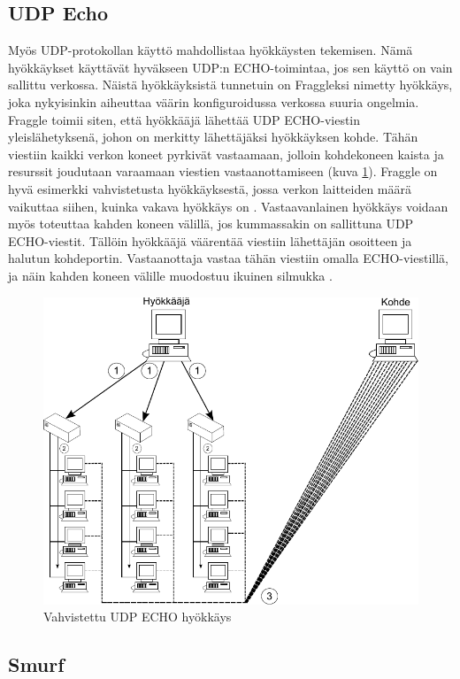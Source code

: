 \subsection{UDP Echo}

Myös UDP-protokollan käyttö mahdollistaa hyökkäysten tekemisen. Nämä
hyökkäykset käyt\-tä\-vät hyväkseen UDP:n ECHO-toimintaa, jos sen käyttö
on vain sallittu verkossa. Näistä hyökkäyksistä tunnetuin on Fraggleksi
nimetty hyökkäys, joka nykyisinkin aiheuttaa väärin konfiguroidussa verkossa suuria ongelmia.
Fraggle toimii siten, että hyökkääjä lähettää UDP ECHO-viestin yleislähetyksenä, johon on merkitty lähettäjäksi
hyökkäyksen kohde. Tähän viestiin kaikki verkon koneet pyrkivät vastaamaan,
jolloin kohdekoneen kaista ja resurssit joudutaan varaamaan viestien vastaanottamiseen (kuva \ref{fraggle}). 
Fraggle on hyvä esimerkki vahvistetusta hyökkäyksestä, jossa verkon laitteiden määrä
vaikuttaa siihen, kuinka vakava hyökkäys on \cite{WEBS}. Vastaavanlainen
hyökkäys voidaan myös toteuttaa kahden koneen välillä, jos kummassakin
on sallittuna UDP ECHO-viestit. Tällöin hyökkääjä väärentää viestiin
lähettäjän osoitteen ja halutun kohdeportin. Vastaanottaja vastaa
tähän viestiin omalla ECHO-viestillä, ja näin kahden koneen välille
muodostuu ikuinen silmukka \cite{TCP}.
\newpage
\begin{figure}[htp]
\centering
\includegraphics[width=12cm]{pics/fraggle.pdf}
\caption{Vahvistettu UDP ECHO hyökkäys}
\label{fraggle}
\end{figure}

\subsection{Smurf}

